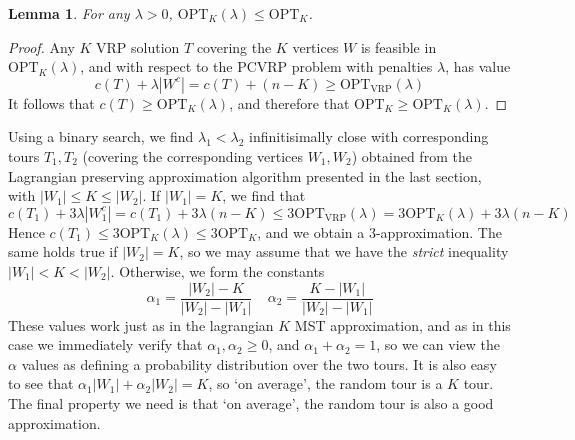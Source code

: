 \documentclass{article}
\theoremstyle{plain}
\newtheorem{lemma}{Lemma}
\theoremstyle{plain}
\begin{document}
\begin{lemma}
    For any $\lambda > 0$, $\text{OPT}_K(\lambda) \leq \text{OPT}_K$.
\end{lemma}
\begin{proof}
    Any $K$ VRP solution $T$ covering the $K$ vertices $W$ is feasible in $\text{OPT}_K(\lambda)$, and with respect to the $\text{PCVRP}$ problem with penalties $\lambda$, has value
    \[ c(T) + \lambda |W^c| = c(T) + (n - K) \geq \text{OPT}_{\text{VRP}}(\lambda) \]
    It follows that $c(T) \geq \text{OPT}_K(\lambda)$, and therefore that $\text{OPT}_K \geq \text{OPT}_K(\lambda)$.
\end{proof}

Using a binary search, we find $\lambda_1 < \lambda_2$ infinitisimally close with corresponding tours $T_1,T_2$ (covering the corresponding vertices $W_1,W_2$) obtained from the Lagrangian preserving approximation algorithm presented in the last section, with $|W_1| \leq K \leq |W_2|$. If $|W_1| = K$, we find that
%
\[ c(T_1) + 3 \lambda |W_1^c| = c(T_1) + 3 \lambda (n - K) \leq 3 \text{OPT}_{\text{VRP}}(\lambda) = 3 \text{OPT}_K(\lambda) + 3 \lambda(n - K) \]
%
Hence $c(T_1) \leq 3 \text{OPT}_K(\lambda) \leq 3 \text{OPT}_K$, and we obtain a $3$-approximation. The same holds true if $|W_2| = K$, so we may assume that we have the {\it strict} inequality $|W_1| < K < |W_2|$. Otherwise, we form the constants
%
\[ \alpha_1 = \frac{|W_2| - K}{|W_2| - |W_1|}\ \ \ \ \ \alpha_2 = \frac{K - |W_1|}{|W_2| - |W_1|} \]
%
These values work just as in the lagrangian $K$ MST approximation, and as in this case we immediately verify that $\alpha_1, \alpha_2 \geq 0$, and $\alpha_1 + \alpha_2 = 1$, so we can view the $\alpha$ values as defining a probability distribution over the two tours. It is also easy to see that $\alpha_1 |W_1| + \alpha_2 |W_2| = K$, so `on average', the random tour is a $K$ tour. The final property we need is that `on average', the random tour is also a good approximation.
\end{document}
